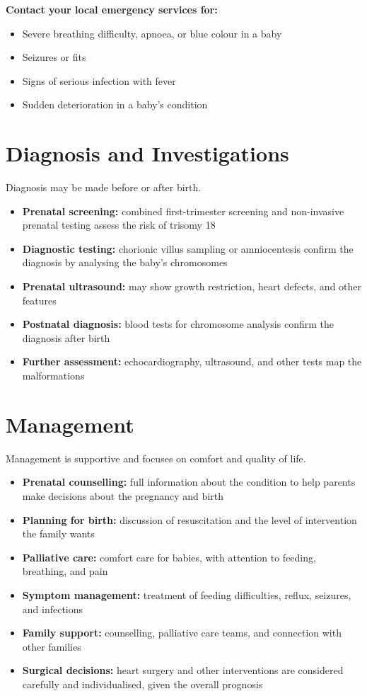 \textbf{Contact your local emergency services for:}
\begin{itemize}
    \item Severe breathing difficulty, apnoea, or blue colour in a baby
    \item Seizures or fits
    \item Signs of serious infection with fever
    \item Sudden deterioration in a baby's condition
\end{itemize}

\section*{Diagnosis and Investigations}
Diagnosis may be made before or after birth.
\begin{itemize}
    \item \textbf{Prenatal screening:} combined first-trimester screening and non-invasive prenatal testing assess the risk of trisomy 18
    \item \textbf{Diagnostic testing:} chorionic villus sampling or amniocentesis confirm the diagnosis by analysing the baby's chromosomes
    \item \textbf{Prenatal ultrasound:} may show growth restriction, heart defects, and other features
    \item \textbf{Postnatal diagnosis:} blood tests for chromosome analysis confirm the diagnosis after birth
    \item \textbf{Further assessment:} echocardiography, ultrasound, and other tests map the malformations
\end{itemize}

\section*{Management}
Management is supportive and focuses on comfort and quality of life.
\begin{itemize}
    \item \textbf{Prenatal counselling:} full information about the condition to help parents make decisions about the pregnancy and birth
    \item \textbf{Planning for birth:} discussion of resuscitation and the level of intervention the family wants
    \item \textbf{Palliative care:} comfort care for babies, with attention to feeding, breathing, and pain
    \item \textbf{Symptom management:} treatment of feeding difficulties, reflux, seizures, and infections
    \item \textbf{Family support:} counselling, palliative care teams, and connection with other families
    \item \textbf{Surgical decisions:} heart surgery and other interventions are considered carefully and individualised, given the overall prognosis
\end{itemize}

